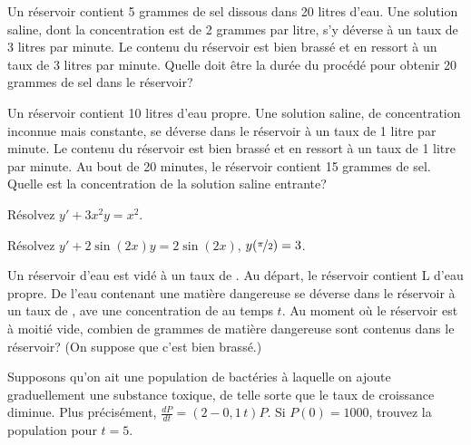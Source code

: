 \begin{exercise}
	Un réservoir contient 5 grammes de sel dissous dans 20 litres d'eau.
	Une solution saline, dont la concentration est de 2 grammes par litre,
	s'y déverse à un taux de 3 litres par minute.
	Le contenu du réservoir est bien brassé et en ressort à un taux de 3 litres par minute. Quelle doit être la durée du procédé pour obtenir 20 grammes de sel dans le réservoir?
\end{exercise}

\begin{exercise}
	Un réservoir contient 10 litres d'eau propre.
	Une solution saline, de concentration inconnue mais constante, se déverse dans le réservoir à un taux de 1 litre par minute.
	Le contenu du réservoir est bien brassé et en ressort à un taux de 1 litre par minute.
	Au bout de 20 minutes, le réservoir contient 15 grammes de sel.  Quelle est la concentration de la solution saline entrante?
\end{exercise}

\setcounter{exercise}{100}

\begin{exercise}
	Résolvez $y'+3 x^2 y = x^2$.
\end{exercise}

\begin{exercise}
	Résolvez $y'+ 2\sin(2x) y = 2\sin(2x)$, $y(\nicefrac{\pi}{2}) = 3$.
\end{exercise}

\begin{exercise}
	Un réservoir d'eau est vidé à un taux de .
	Au départ, le réservoir contient \unit[10]{L} d'eau propre.
	De l'eau contenant une matière dangereuse se déverse dans le réservoir à un taux de ,
	ave une concentration de  au temps $t$.
	Au moment où le réservoir est à moitié vide, combien de grammes de matière dangereuse sont contenus dans le réservoir?
	(On suppose que c'est bien brassé.)
\end{exercise}

\begin{exercise}
	Supposons qu'on ait une population de bactéries à laquelle on ajoute graduellement une substance toxique,
	de telle sorte que le taux de croissance diminue.  Plus précisément, $\frac{dP}{dt} = (2-0{,}1\,t)P$.
	Si $P(0) = 1000$, trouvez la population pour $t=5$.
\end{exercise}

